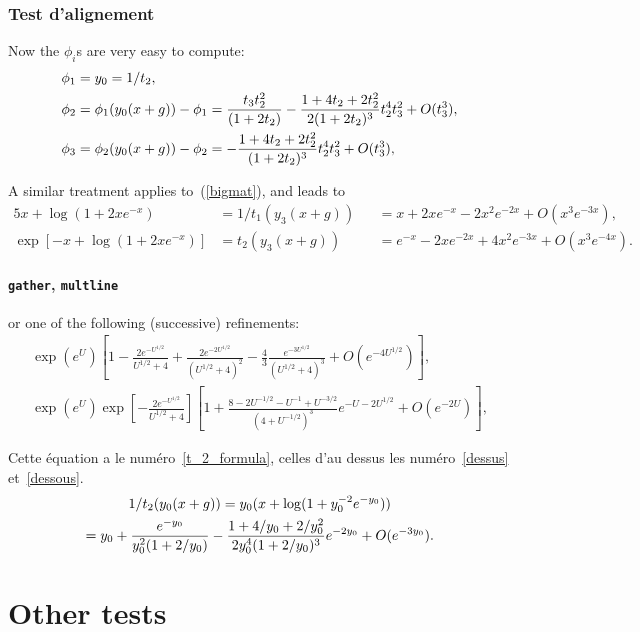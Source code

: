 \documentclass{article}
\numberwithin{equation}{section}
\begin{document}
\section{Test d'alignement}
Now the $\phi_i$s are very easy to compute:
\begin{align*}
\phi_1&  =  y_0 = 1/t_2,\\
\phi_2&  = \phi_1(y_0(x+g))-\phi_1 = {t_3t_2^2\over(1+2t_2)}
-{1+4t_2+2t_2^2\over2(1+2t_2)^3}t_2^4t_3^2+O(t_3^3),\\
\phi_3&  = \phi_2(y_0(x+g))-\phi_2 = -{1+4t_2+2t_2^2\over(1+2t_2)^3}t_2^4t_3^2+O(t_3^3),
\end{align*}

A similar treatment applies to~(\ref{bigmat}), and leads to
\begin{alignat*}{5}
x+\log(1+2xe^{-x})&  =  1/t_1(y_3(x+g))&&  =  x+2xe^{-x}-2x^2e^{-2x}+O(x^3e^{-3x}),\\
\exp[-x+\log(1+2xe^{-x})]&  =  t_2(y_3(x+g))&&  =  e^{-x}-2xe^{-2x}+4x^2e^{-3x}+O(x^3e^{-4x}).
\end{alignat*}

\subsection{\texttt{gather}, \texttt{multline}}
or one of the following (successive) refinements:
\begin{gather}\label{dessus}
\exp(e^U)\left[1-\frac{2e^{-U^{1/2}}}{U^{1/2}+4}
+\frac{2e^{-2U^{1/2}}}{(U^{1/2}+4)^2}
-\frac{4}{3}\frac{e^{-3U^{1/2}}}{(U^{1/2}+4)^3}+O(e^{-4U^{1/2}})\right],\\
\exp(e^U)\exp\left[-\frac{2e^{-U^{1/2}}}{U^{1/2}+4}\right]\left[1+
\frac{8-2U^{-1/2}-U^{-1}+U^{-3/2}}{(4+U^{-1/2})^3}
e^{-U-2U^{1/2}}+O(e^{-2U})\right],\label{dessous}
\end{gather}

Cette \'equation a le num\'ero~\ref{t_2_formula}, celles d'au dessus les
num\'ero~\ref{dessus} et~\ref{dessous}.
\begin{multline}	\label{t_2_formula}
1/t_2(y_0(x+g)) = y_0(x+\log(1+y_0^{-2}e^{-y_0}))\\
 = y_0+{e^{-y_0}\over y_0^2(1+2/y_0)}
-{1+4/y_0+2/y_0^2\over 2y_0^4(1+2/y_0)^3}e^{-2y_0}+O(e^{-3y_0}).
\end{multline}

\part{Other tests}
\end{document}
